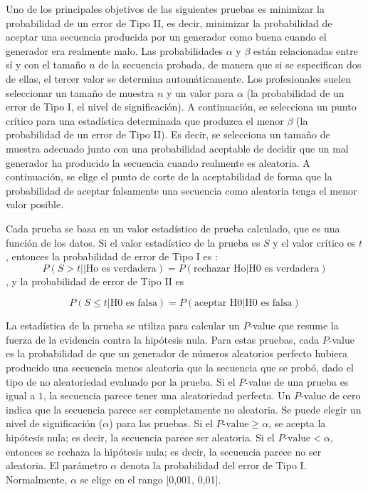 Uno de los principales objetivos de las siguientes pruebas es minimizar la probabilidad de un error de Tipo II, es decir, minimizar la probabilidad de aceptar una secuencia producida por un generador como buena cuando el generador era realmente malo. Las probabilidades $\alpha$ y $\beta$ están relacionadas entre sí y con el tamaño $n$ de la secuencia probada, de manera que si se especifican dos de ellas, el tercer valor se determina automáticamente. Los profesionales suelen seleccionar un tamaño de muestra $n$ y un valor para $\alpha$ (la probabilidad de un error de Tipo I, el nivel de significación). A continuación, se selecciona un punto crítico para una estadística determinada que produzca el menor $\beta$ (la probabilidad de un error de Tipo II). Es decir, se selecciona un tamaño de muestra adecuado junto con una probabilidad aceptable de decidir que un mal generador ha producido la secuencia cuando realmente es aleatoria. A continuación, se elige el punto de corte de la aceptabilidad de forma que la probabilidad de aceptar falsamente una secuencia como aleatoria tenga el menor valor posible.

Cada prueba se basa en un valor estadístico de prueba calculado, que es una función de los datos. Si el valor estadístico de la prueba es $S$ y el valor crítico es $t$, entonces la probabilidad de error de Tipo I es :
\begin{equation}
P(S > t || \text{Ho es verdadera}) = P(\text{rechazar Ho} | \text{H0 es verdadera})
\end{equation}
, y la probabilidad de error de Tipo II es 

\begin{equation}
P(S \leq t | \text{H0 es falsa}) = P(\text{aceptar H0} | \text{H0 es falsa})
\end{equation}


La estadística de la prueba se utiliza para calcular un $P$-value que resume la fuerza de la evidencia contra la hipótesis nula. Para estas pruebas, cada $P$-value es la probabilidad de que un generador de números aleatorios perfecto hubiera producido una secuencia menos aleatoria que la secuencia que se probó, dado el tipo de no aleatoriedad evaluado por la prueba. Si el $P$-value de una prueba es igual a $1$, la secuencia parece tener una aleatoriedad perfecta. Un $P$-value de cero indica que la secuencia parece ser completamente no aleatoria. Se puede elegir un nivel de significación ($\alpha$) para las pruebas. Si el  $P\text{-value} \geq \alpha$, se acepta la hipótesis nula; es decir, la secuencia parece ser aleatoria. Si el $P\text{-value} < \alpha$, entonces se rechaza la hipótesis nula; es decir, la secuencia parece no ser aleatoria. El parámetro $\alpha$ denota la probabilidad del error de Tipo I. Normalmente, $\alpha$ se elige en el rango [0,001, 0,01].


